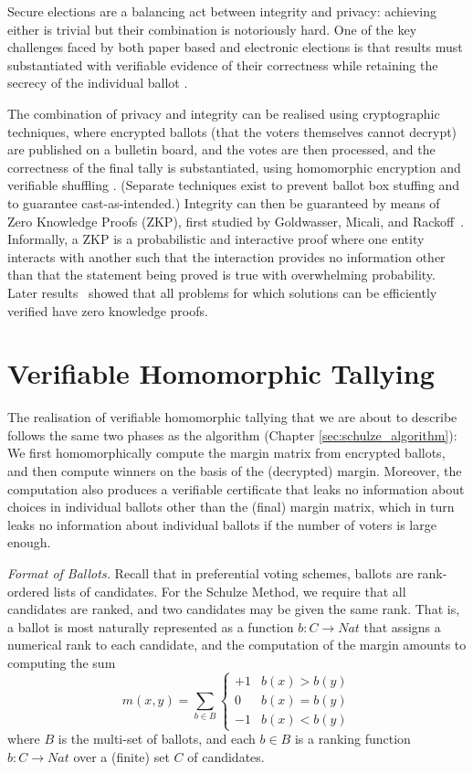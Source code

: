  


Secure elections are a balancing act between integrity and privacy:
achieving either is trivial but their combination is notoriously hard.
One of the key challenges faced by both paper based and electronic
elections is that results must substantiated with
verifiable evidence of their correctness while retaining the secrecy
of the individual ballot \citep{Bernhard:2017:PES}.  


The combination of privacy and integrity can be realised using cryptographic techniques, where
encrypted ballots (that the voters themselves cannot decrypt) are
published on a bulletin board, and the votes are then processed, and
the correctness of the final tally is substantiated, using
homomorphic encryption \citep{Hirt:2000:ERF} and verifiable shuffling
\citep{Bayer:2012:EZK}. (Separate techniques exist to prevent ballot
box stuffing and to guarantee cast-as-intended.)
Integrity can then be guaranteed by means of Zero Knowledge Proofs
(ZKP),
first studied by Goldwasser, Micali, and Rackoff~\citep{Goldwasser:1985:STOC}.
Informally, a ZKP is a probabilistic and interactive proof where one
entity interacts with another such that the interaction provides
no information other than that the statement being proved is true with
overwhelming probability. 
Later results~\citep{Ben-Or:1988:CRYPTO,Goldreich:1991:ACM}
showed that 
all problems for which solutions can be efficiently verified have zero knowledge
proofs.

  
 \section{Verifiable Homomorphic Tallying}
\label{sec:verifiable_homomorphic}
The realisation of verifiable homomorphic tallying that we are about to
describe follows the same two phases as the algorithm (Chapter \ref{sec:schulze_algorithm}): 
We first homomorphically compute the margin matrix from encrypted ballots, and then compute
winners on the basis of the (decrypted) margin. Moreover, the computation also
produces a verifiable certificate that leaks no information about
choices in individual ballots other than the (final) margin matrix, which in
turn leaks no information about individual ballots if the number of
voters is large enough. 


\smallskip\noindent\emph{Format of Ballots.} Recall that in preferential voting
schemes, ballots are rank-ordered lists of candidates. For the
Schulze Method, we require that all candidates are ranked, and two
candidates may be given the same rank. That is, a ballot is most
naturally represented as a function $b: C \to Nat$ that assigns a
numerical rank to each candidate, and the computation of the margin
amounts to computing the sum
\[ m(x, y) = \sum_{b \in B} \begin{cases} +1 & b(x) > b(y) \\ 0 &
b(x) = b(y) \\ -1 & b(x) < b(y) \end{cases} \]
where $B$ is the multi-set of ballots, and each $b \in B$ is a
ranking function $b: C \to Nat$ over a (finite) set $C$ of
candidates. 

